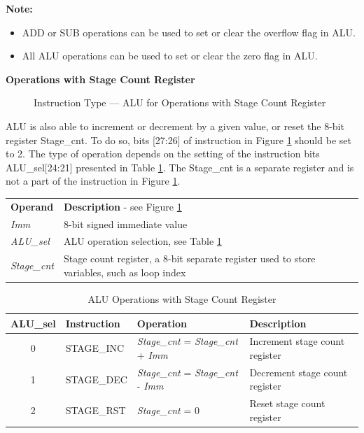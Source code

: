 \documentclass[main\_\_EN.tex]{subfiles}
\begin{document}
\textbf{Note:}
\begin{itemize}
    \item ADD or SUB operations can be used to set or clear the overflow flag in ALU.
    \item All ALU operations can be used to set or clear the zero flag in ALU.
\end{itemize}


\textcolor{istcolor}{\textbf{ Operations with Stage Count Register}}
\label{section:StageCount}


%
%
%
%
%
%
%
\begin{figure}[!ht ]
    \centering
    \caption{Instruction Type — ALU for Operations with Stage Count Register}
    \label{figure:ALU-with-stage-count}
\end{figure}

ALU is also able to increment or decrement by a given value, or reset the 8-bit register Stage\_cnt. To do so, bits [27:26] of instruction in Figure \ref{figure:ALU-with-stage-count} should be set to 2. The type of operation depends on the setting of the instruction bits ALU\_sel[24:21] presented in Table  \ref{figure:ALU-with-stage-count}. The Stage\_cnt is a separate register and is not a part of the instruction in Figure \ref{figure:ALU-with-stage-count}.

\begin{tabular}{ l l }
\textbf{Operand} & \textbf{Description} - see Figure \ref{figure:ALU-with-stage-count} \\
\textit{Imm} & 8-bit signed immediate value\\
\textit{ALU\_sel} & ALU operation selection, see Table \ref{table:ALU-with-stage-count}\\
\textit{Stage\_cnt} & Stage count register, a 8-bit separate register used to store variables, such as loop index

\end{tabular}

\begin{table}[!ht ]
    \centering
    \begin{tabular}{ c l l l }
    \textbf{ALU\_sel} & \textbf{Instruction} & \textbf{Operation} & \textbf{Description} \\ \hline
    0 & STAGE\_INC & \textit{Stage\_cnt} = \textit{Stage\_cnt} + \textit{Imm} & Increment stage count register \\
    1 & STAGE\_DEC & \textit{Stage\_cnt} = \textit{Stage\_cnt} - \textit{Imm} & Decrement stage count register \\
    2 & STAGE\_RST & \textit{Stage\_cnt} = 0 & Reset stage count register
    \end{tabular}
    \caption{ALU Operations with Stage Count Register}
    \label{table:ALU-with-stage-count}
\end{table}
\end{document}
